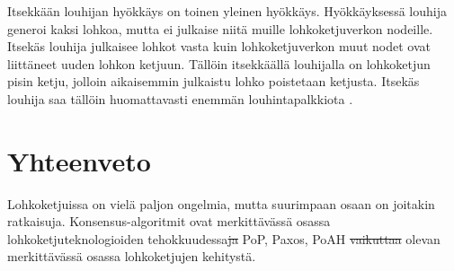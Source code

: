 \documentclass[utf8,bachelor]{gradu3}
\providecommand{\DIFaddtex}[1]{{\protect\color{blue}\uwave{#1}}} %
\providecommand{\DIFdeltex}[1]{{\protect\color{red}\sout{#1}}}                      %
\providecommand{\DIFaddbegin}{} %
\providecommand{\DIFaddend}{} %
\providecommand{\DIFdelbegin}{} %
\providecommand{\DIFdelend}{} %
\providecommand{\DIFadd}[1]{\texorpdfstring{\DIFaddtex{#1}}{#1}} %
\providecommand{\DIFdel}[1]{\texorpdfstring{\DIFdeltex{#1}}{}} %
\newcommand{\DIFscaledelfig}{0.5}
\newlength{\DIFdelgraphicswidth} %
\newlength{\DIFdelgraphicsheight} %
\newcommand{\DIFaddincludegraphics}[2][]{{\color{blue}\fbox{\DIFOincludegraphics[#1]{#2}}}} %
\newcommand{\DIFdelincludegraphics}[2][]{%
\sbox{\DIFdelgraphicsbox}{\DIFOincludegraphics[#1]{#2}}%
\settoboxwidth{\DIFdelgraphicswidth}{\DIFdelgraphicsbox} %
\settoboxtotalheight{\DIFdelgraphicsheight}{\DIFdelgraphicsbox} %
\scalebox{\DIFscaledelfig}{%
\parbox[b]{\DIFdelgraphicswidth}{\usebox{\DIFdelgraphicsbox}\\[-\baselineskip] \rule{\DIFdelgraphicswidth}{0em}}\llap{\resizebox{\DIFdelgraphicswidth}{\DIFdelgraphicsheight}{%
\setlength{\unitlength}{\DIFdelgraphicswidth}%
\begin{picture}(1,1)%
\thicklines\linethickness{2pt} %
{\color[rgb]{1,0,0}\put(0,0){\framebox(1,1){}}}%
{\color[rgb]{1,0,0}\put(0,0){\line( 1,1){1}}}%
{\color[rgb]{1,0,0}\put(0,1){\line(1,-1){1}}}%
\end{picture}%
}\hspace*{3pt}}} %
} %
\DeclareRobustCommand{\DIFaddbegin}{\DIFOaddbegin \let\includegraphics\DIFaddincludegraphics} %
\DeclareRobustCommand{\DIFaddend}{\DIFOaddend \let\includegraphics\DIFOincludegraphics} %
\DeclareRobustCommand{\DIFdelbegin}{\DIFOdelbegin \let\includegraphics\DIFdelincludegraphics} %
\DeclareRobustCommand{\DIFdelend}{\DIFOaddend \let\includegraphics\DIFOincludegraphics} %
\begin{document}
Itsekkään louhijan hyökkäys on toinen yleinen hyökkäys. Hyökkäyksessä louhija generoi kaksi lohkoa, mutta ei julkaise niitä muille lohkoketjuverkon nodeille. Itsekäs louhija julkaisee lohkot vasta kuin lohkoketjuverkon muut nodet ovat liittäneet uuden lohkon ketjuun. Tällöin itsekkäällä louhijalla on lohkoketjun pisin ketju, jolloin aikaisemmin julkaistu lohko poistetaan ketjusta. Itsekäs louhija saa tällöin huomattavasti enemmän louhintapalkkiota \parencite{zheng2017overview}. 




 \chapter{Yhteenveto}

 Lohkoketjuissa on vielä paljon ongelmia, mutta suurimpaan osaan on joitakin ratkaisuja.
 Konsensus-algoritmit ovat merkittävässä osassa lohkoketjuteknologioiden tehokkuudessa\DIFdelbegin \DIFdel{ja }\DIFdelend \DIFaddbegin \DIFadd{.
 }\DIFaddend PoP, Paxos, PoAH \DIFdelbegin \DIFdel{vaikuttaa }\DIFdelend \DIFaddbegin \DIFadd{vaikuttavat }\DIFaddend olevan merkittävässä osassa lohkoketjujen kehitystä.

 
 


\printbibliography

\appendix
\end{document}
